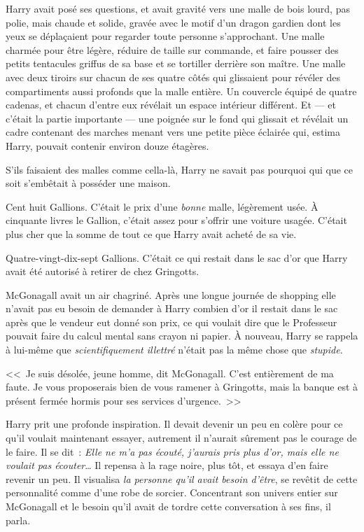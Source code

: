 Harry avait posé ses questions, et avait gravité vers une malle de bois lourd, pas polie, mais chaude et solide, gravée avec le motif d'un dragon gardien dont les yeux se déplaçaient pour regarder toute personne s'approchant. Une malle charmée pour être légère, réduire de taille sur commande, et faire pousser des petits tentacules griffus de sa base et se tortiller derrière son maître. Une malle avec deux tiroirs sur chacun de ses quatre côtés qui glissaient pour révéler des compartiments aussi profonds que la malle entière. Un couvercle équipé de quatre cadenas, et chacun d'entre eux révélait un espace intérieur différent. Et — et c'était la partie importante — une poignée sur le fond qui glissait et révélait un cadre contenant des marches menant vers une petite pièce éclairée qui, estima Harry, pouvait contenir environ douze étagères.

S'ils faisaient des malles comme cella-là, Harry ne savait pas pourquoi qui que ce soit s'embêtait à posséder une maison.

Cent huit Gallions. C'était le prix d'une \emph{bonne} malle, légèrement usée. À cinquante livres le Gallion, c'était assez pour s'offrir une voiture usagée. C'était plus cher que la somme de tout ce que Harry avait acheté de sa vie.

Quatre-vingt-dix-sept Gallions. C'était ce qui restait dans le sac d'or que Harry avait été autorisé à retirer de chez Gringotts.

McGonagall avait un air chagriné. Après une longue journée de shopping elle n'avait pas eu besoin de demander à Harry combien d'or il restait dans le sac après que le vendeur eut donné son prix, ce qui voulait dire que le Professeur pouvait faire du calcul mental sans crayon ni papier. À nouveau, Harry se rappela à lui-même que \emph{scientifiquement illettré} n'était pas la même chose que \emph{stupide}.

<<~Je suis désolée, jeune homme, dit McGonagall. C'est entièrement de ma faute. Je vous proposerais bien de vous ramener à Gringotts, mais la banque est à présent fermée hormis pour ses services d'urgence.~>>

Harry prit une profonde inspiration. Il devait devenir un peu en colère pour ce qu'il voulait maintenant essayer, autrement il n'aurait sûrement pas le courage de le faire. Il se dit~: \emph{Elle ne m'a pas écouté, j'aurais pris plus d'or, mais elle ne voulait pas écouter}… Il repensa à la rage noire, plus tôt, et essaya d'en faire revenir un peu. Il visualisa \emph{la personne qu'il avait besoin d'être}, se revêtit de cette personnalité comme d'une robe de sorcier. Concentrant son univers entier sur McGonagall et le besoin qu'il avait de tordre cette conversation à ses fins, il parla.

